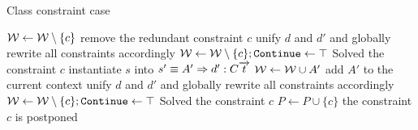 \begin{algorithm}
    \caption{Class constraint case}
    \label{case_class}
    \begin{algorithmic}
            \State $\mathcal W \gets \mathcal W \setminus \{c\}$ \Comment remove the redundant constraint $c$
            \State unify $d$ and $d'$ and globally rewrite all constraints accordingly
            \State $\mathcal W \gets \mathcal W \setminus \{c\}; \mathtt{Continue} \gets \top$ \Comment Solved the constraint $c$
            \State instantiate $s$ into $s' \equiv A' \Rightarrow d' : C \overrightarrow{t}$
            \State $\mathcal{W} \gets \mathcal{W} \cup A'$ \Comment add $A'$ to the current context
            \State unify $d$ and $d'$ and globally rewrite all constraints accordingly
            \State $\mathcal W \gets \mathcal W \setminus \{c\}; \mathtt{Continue} \gets \top$ \Comment Solved the constraint $c$
        \Else
            \State $P \gets P \cup \{c\}$ \Comment the constraint $c$ is postponed
        \EndIf
    \end{algorithmic}
\end{algorithm}

